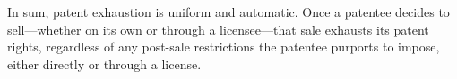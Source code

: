 %

In sum, patent exhaustion is uniform and automatic. Once a patentee decides to
sell---whether on its own or through a licensee---that sale exhausts its patent
rights, regardless of any post-sale restrictions the patentee purports to
impose, either directly or through a license.

